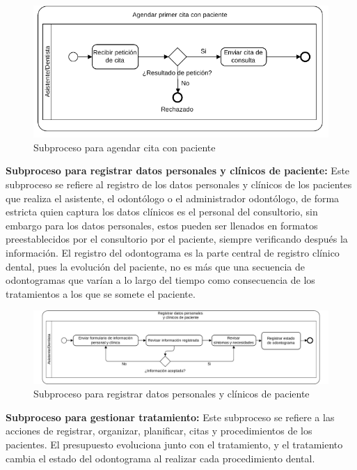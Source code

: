 \begin{figure}[H]
\centering
\centerline{ \includegraphics[width=12cm, keepaspectratio]{pictures/picture08.pdf}}
\caption{Subproceso para agendar cita con paciente}
\end{figure}

\noindent\textbf{Subproceso para registrar datos personales y clínicos de paciente:} Este subproceso se refiere al registro de los datos personales y clínicos de los pacientes que realiza el asistente, el odontólogo o el administrador odontólogo, de forma estricta quien captura los datos clínicos es el personal del consultorio, sin embargo para los datos personales, estos pueden ser llenados en formatos preestablecidos por el consultorio por el paciente, siempre verificando después la información. El registro del odontograma es la parte central de registro clínico dental, pues la evolución del paciente, no es más que una secuencia de odontogramas que varían a lo largo del tiempo como consecuencia de los tratamientos a los que se somete el paciente.

\begin{figure}[H]
\centering
\centerline{\includegraphics[width=18cm, keepaspectratio]{pictures/picture09.pdf}}
\caption{Subproceso para registrar datos personales y clínicos de paciente}
\end{figure}

\noindent\textbf{Subproceso para gestionar tratamiento:} Este subproceso se refiere a las acciones de registrar, organizar, planificar, citas y procedimientos de los pacientes. El presupuesto evoluciona junto con el tratamiento, y el tratamiento cambia el estado del odontograma al realizar cada procedimiento dental.

